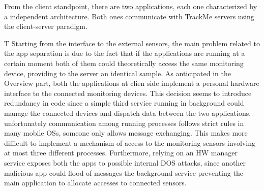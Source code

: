 


	
	
{}

From the client standpoint, there are two applications, each one characterized by a independent architecture. Both ones communicate with TrackMe servers using the client-server paradigm. 


{}
T
{}
Starting from the interface to the external sensors, the main problem related to the app separation is due to the fact that if the applications are running at a certain moment both of them could theoretically access the same monitoring device, providing to the server an identical sample. As anticipated in the Overview part, both the applications at clien side implement a personal hardware interface to the connected monitoring devices. This decision seems to introduce redundancy in code since a simple third service running in background could manage the connected devices and dispatch data between the two applications, unfortunately communication among running processes follows strict rules in many mobile OSs, someone only allows message exchanging. This makes more difficult to implement a mechanism of access to the monitoring sensors involving at most three different processes. Furthermore, relying on an HW manager service exposes both the apps to possible internal DOS attacks, since another malicious app could flood of messages the background service preventing the main application to allocate accesses to connected sensors.

